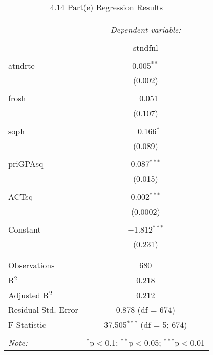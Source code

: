 \documentclass[11pt]{article} %
\begin{document}
  \begin{table}[!htbp] \centering 
    \caption{4.14 Part(e) Regression Results} 
    \label{table:4.14(e)} 
  \begin{tabular}{@{\extracolsep{5pt}}lc} 
  \\[-1.8ex]\hline 
  \hline \\[-1.8ex] 
   & \multicolumn{1}{c}{\textit{Dependent variable:}} \\ 
  \cline{2-2} 
  \\[-1.8ex] & stndfnl \\ 
  \hline \\[-1.8ex] 
   atndrte & 0.005$^{**}$ \\ 
    & (0.002) \\ 
    & \\ 
   frosh & $-$0.051 \\ 
    & (0.107) \\ 
    & \\ 
   soph & $-$0.166$^{*}$ \\ 
    & (0.089) \\ 
    & \\ 
   priGPAsq & 0.087$^{***}$ \\ 
    & (0.015) \\ 
    & \\ 
   ACTsq & 0.002$^{***}$ \\ 
    & (0.0002) \\ 
    & \\ 
   Constant & $-$1.812$^{***}$ \\ 
    & (0.231) \\ 
    & \\ 
  \hline \\[-1.8ex] 
  Observations & 680 \\ 
  R$^{2}$ & 0.218 \\ 
  Adjusted R$^{2}$ & 0.212 \\ 
  Residual Std. Error & 0.878 (df = 674) \\ 
  F Statistic & 37.505$^{***}$ (df = 5; 674) \\ 
  \hline 
  \hline \\[-1.8ex] 
  \textit{Note:}  & \multicolumn{1}{r}{$^{*}$p$<$0.1; $^{**}$p$<$0.05; $^{***}$p$<$0.01} \\ 
  \end{tabular} 
  \end{table} 
\end{document}
